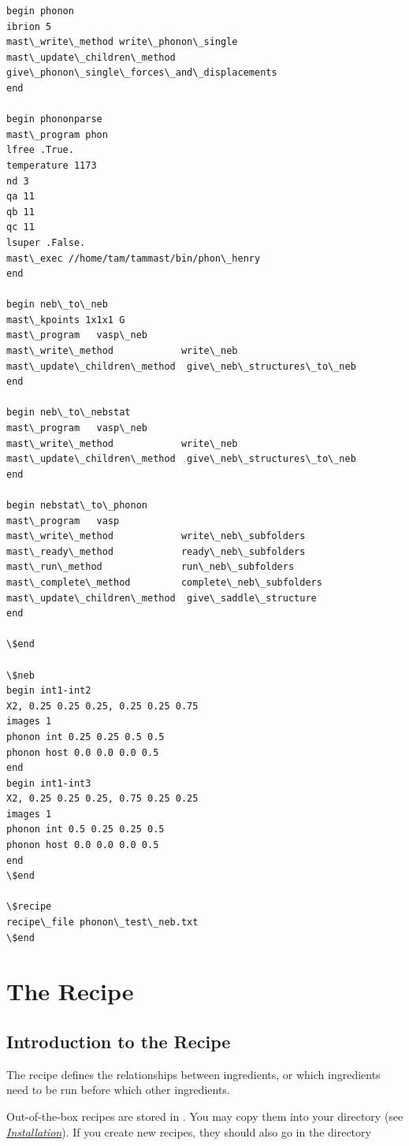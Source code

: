 \documentclass[letterpaper,10pt,english]{sphinxmanual}
\begin{document}
\begin{Verbatim}[commandchars=\\\{\}]
begin phonon
ibrion 5
mast\_write\_method write\_phonon\_single
mast\_update\_children\_method give\_phonon\_single\_forces\_and\_displacements
end

begin phononparse
mast\_program phon
lfree .True.
temperature 1173
nd 3
qa 11
qb 11
qc 11
lsuper .False.
mast\_exec //home/tam/tammast/bin/phon\_henry
end

begin neb\_to\_neb
mast\_kpoints 1x1x1 G
mast\_program   vasp\_neb
mast\_write\_method            write\_neb
mast\_update\_children\_method  give\_neb\_structures\_to\_neb
end

begin neb\_to\_nebstat
mast\_program   vasp\_neb
mast\_write\_method            write\_neb
mast\_update\_children\_method  give\_neb\_structures\_to\_neb
end

begin nebstat\_to\_phonon
mast\_program   vasp
mast\_write\_method            write\_neb\_subfolders
mast\_ready\_method            ready\_neb\_subfolders
mast\_run\_method              run\_neb\_subfolders
mast\_complete\_method         complete\_neb\_subfolders
mast\_update\_children\_method  give\_saddle\_structure
end

\$end

\$neb
begin int1-int2
X2, 0.25 0.25 0.25, 0.25 0.25 0.75
images 1
phonon int 0.25 0.25 0.5 0.5
phonon host 0.0 0.0 0.0 0.5
end
begin int1-int3
X2, 0.25 0.25 0.25, 0.75 0.25 0.25
images 1
phonon int 0.5 0.25 0.25 0.5
phonon host 0.0 0.0 0.0 0.5
end
\$end

\$recipe
recipe\_file phonon\_test\_neb.txt
\$end
\end{Verbatim}


\chapter{The Recipe}
\label{4_0_recipe:the-recipe}\label{4_0_recipe::doc}

\section{Introduction to the Recipe}
\label{4_0_recipe:introduction-to-the-recipe}
The recipe defines the relationships between ingredients, or which ingredients need to be run before which other ingredients.

Out-of-the-box recipes are stored in . You may copy them into your  directory (see {\hyperref[1_0_installation::doc]{\emph{Installation}}}). If you create new recipes, they should also go in the   directory
\end{document}
